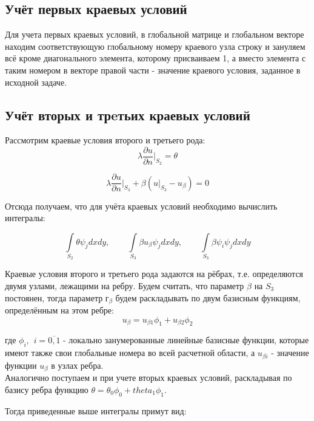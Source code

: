 \documentclass[12pt,a4paper]{article}
\begin{document}
\subsection*{Учёт первых краевых условий}

Для учета первых краевых условий, в глобальной матрице
и глобальном векторе находим соответствующую глобальному
номеру краевого узла строку и зануляем всё кроме
диагонального элемента, которому присваиваем 1, а вместо
элемента с таким номером в векторе правой части - значение
краевого условия, заданное в исходной задаче.


\subsection*{Учёт вторых и трeтьих краевых условий}

Рассмотрим краевые условия второго и третьего рода:
$$
    \lambda \frac{\partial u}{\partial n}
    \bigg\vert_{S_2} = \theta
$$

$$
    \lambda \frac{\partial u}{\partial n}
    \bigg\vert_{S_3} +
    \beta(u \vert_{S_3} - u_{\beta}) = 0
$$

\noindent Отсюда получаем, что для учёта краевых условий
необходимо вычислить интегралы:

$$
    \int \limits_{S_2} \theta \psi_j dxdy,          \hspace{25pt}
    \int \limits_{S_3} \beta u_{\beta} \psi_j dxdy, \hspace{25pt}
    \int \limits_{S_3} \beta \psi_i \psi_j dxdy
$$

\noindent Краевые условия второго и третьего рода задаются
на рёбрах, т.е. определяются двумя узлами, лежащими на
ребру. Будем считать, что параметр $\beta$ на $S_3$
постоянен, тогда параметр $г_{\beta}$ будем
раскладывать по двум базисным функциям,
определённым на этом ребре:
$$ u_{\beta} = u_{\beta 1} \phi_1 + u_{\beta 2} \phi_2 $$


\noindent где $\phi_i, \hspace{5pt} i=\overline{0,1}$
- локально занумерованные линейные базисные функции,
которые имеют также свои глобальные номера во всей
расчетной области, а $u_{\beta i}$ - значение функции
$u_{\beta}$ в узлах ребра. \\

\noindent Аналогично поступаем и при учете вторых
краевых условий, раскладывая по базису ребра функцию
$\theta = \theta_0 \phi_0 + theta_1 \phi_1$.

\noindent Тогда приведенные выше интегралы примут вид:
\end{document}
